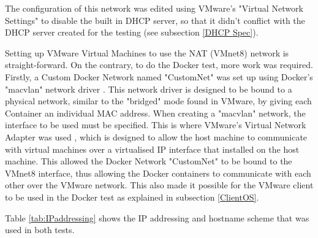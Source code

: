 The configuration of this network was edited using VMware's "Virtual Network Settings" \citep{VMwareNetChange} to disable the built in DHCP server, so that it didn't conflict with the DHCP server created for the testing (see subsection \ref{DHCP Spec}).

Setting up VMware Virtual Machines to use the NAT (VMnet8) network is straight-forward. On the contrary, to do the Docker test, more work was required. Firstly, a Custom Docker Network named "CustomNet" was set up using Docker's "macvlan" network driver \citep{DockerMacVlan}. This network driver is designed to be bound to a physical network, similar to the "bridged" mode found in VMware, by giving each Container an individual MAC address. When creating a "macvlan" network, the interface to be used must be specified. This is where VMware's Virtual Network Adapter was used \citep{VMwareNetworkAdapter}, which is designed to allow the host machine to communicate with virtual machines over a virtualised IP interface that installed on the host machine. This allowed the Docker Network "CustomNet" to be bound to the VMnet8 interface, thus allowing the Docker containers to communicate with each other over the VMware network. This also made it possible for the VMware client to be used in the Docker test as explained in subsection \ref{ClientOS}.

Table \ref{tab:IPaddressing} shows the IP addressing and hostname scheme that was used in both tests.

\begin{table}[H]
\caption{}
\label{tab:IPaddressing}
\centering
{}
\end{table}

